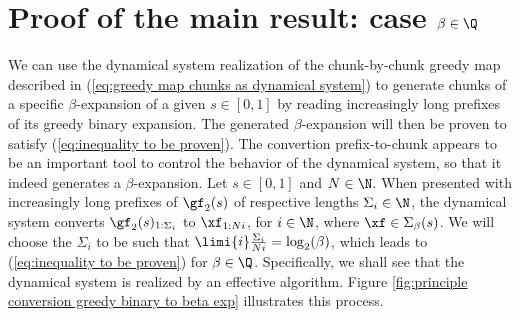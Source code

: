


\section{\texorpdfstring{Proof of the main result: case $\beta \in \Q$}{}}

\label{sec:new beta map}

We can use the dynamical system realization of the chunk-by-chunk greedy map described in (\ref{eq:greedy map chunks as dynamical system}) to generate chunks of a specific $\beta$-expansion of a given $s \in [0,1]$ by reading increasingly long prefixes of its greedy binary expansion. The generated $\beta$-expansion will then be proven to satisfy (\ref{eq:inequality to be proven}). The convertion prefix-to-chunk appears to be an important tool to control the behavior of the dynamical system, so that it indeed generates a $\beta$-expansion. Let $s \in [0,1]$ and $N \in \N$. When presented with increasingly long prefixes of $\gf_2(s)$ of respective lengths $\Sigma_i \in \N$, the dynamical system converts $\gf_2(s)_{1: \Sigma_i}$ to $\xf_{1: Ni}$, for $i \in \N$, where $\xf \in \Sigma_\beta(s)$. We will choose the $\Sigma_i$ to be such that $\limi{i} \frac{\Sigma_i}{Ni} = \log_2(\beta)$, which leads to (\ref{eq:inequality to be proven}) for $\beta \in \Q$. Specifically, we shall see that the dynamical system is realized by an effective algorithm. Figure \ref{fig:principle conversion greedy binary to beta exp} illustrates this process.

